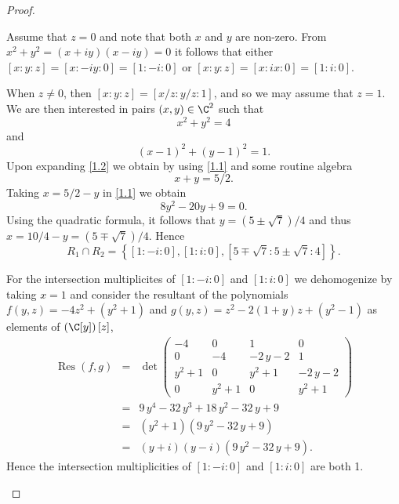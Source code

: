 \documentclass[10pt]{amsart}
\begin{document}
\begin{thm}
\begin{proof}
\begin{enumerate}[(a)]
      Assume that $z = 0$ and note that both $x$ and $y$ are non-zero.
      From $x^2 + y^2 = (x + iy)(x - iy) = 0$ it follows that either $[x : y : z] = [x : -iy : 0] = [1 : -i : 0]$
      or $[x : y : z] = [x : ix : 0] = [1 : i : 0]$.
      
      When $z \neq 0$, then $[x : y : z] = [x/z : y/z : 1]$, and so we may assume that $z = 1$.
      We are then interested in pairs $(x,y) \in \C^2$ such that 
      \begin{equation}\label{1.1}
	x^2 + y^2 = 4
      \end{equation}
      and 
      \begin{equation}\label{1.2}
	(x - 1)^2 + (y-1)^2 = 1.
      \end{equation}
      Upon expanding \eqref{1.2} we obtain by using \eqref{1.1} and some routine algebra 
      $$x + y = 5/2.$$
      Taking $x = 5/2 - y$ in \eqref{1.1} we obtain
      $$8y^2 - 20y + 9 = 0.$$
      Using the quadratic formula, it follows that $y = (5 \pm \sqrt{7})/4$ and thus $x = 10/4 - y = \left(5 \mp \sqrt{7}\right)/4$.
      Hence
      $$R_1 \cap R_2 = \left\{[1 : -i : 0], [1 : i : 0], [5 \mp \sqrt{7} : 5 \pm \sqrt{7} : 4]\right\}.$$

      For the intersection multiplicites of $[1 : -i : 0]$ and $[1 : i : 0]$ we dehomogenize by taking $x = 1$ and consider the resultant of the polynomials $f(y,z) = -4z^2 + (y^2 + 1)$ and $g(y,z) = z^2 - 2(1 + y)z + (y^2 - 1)$ as elements of $\left(\C[y]\right)[z]$, 
      \begin{eqnarray*}
        \operatorname{Res}(f,g) &=& \det\left(\begin{array}{cccc}
          -4 & 0 & 1 & 0 \\
          0 & -4 & -2 \, y - 2 & 1 \\
          y^{2} + 1 & 0 & y^{2} + 1 & -2 \, y - 2 \\
          0 & y^{2} + 1 & 0 & y^{2} + 1
        \end{array}\right)\\
        &=& 9 \, y^{4} - 32 \, y^{3} + 18 \, y^{2} - 32 \, y + 9\\
        &=& {\left(y^{2} + 1\right)} {\left(9 \, y^{2} - 32 \, y + 9\right)}\\
        &=& {\left(y + i\right)} {\left(y - i\right)} {\left(9 \, y^{2} - 32 \, y + 9\right)}.
      \end{eqnarray*}
      Hence the intersection multiplicities of $[1 : -i : 0]$ and $[1 : i : 0]$ are both 1.
      

\end{enumerate}
\end{proof}
\end{thm}
\end{document}
